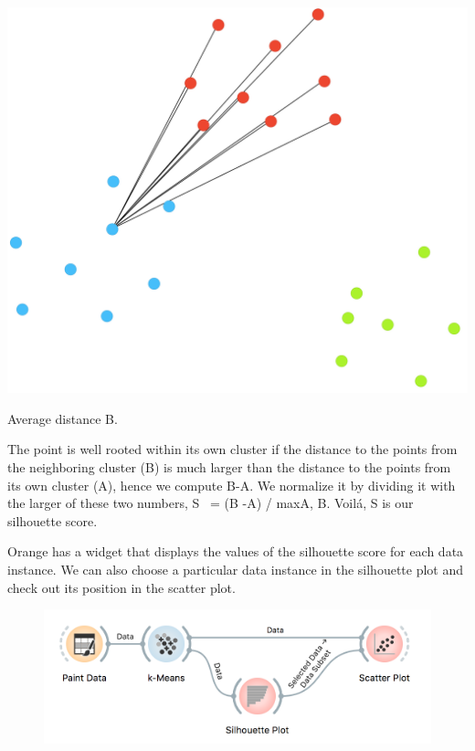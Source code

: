 \begin{marginfigure}
    \centering
    \includegraphics[scale=0.25]{silhouette-pt2.png}
    \caption{Average distance B.}
\end{marginfigure}

The point is well rooted within its own cluster if the distance to the points from the neighboring cluster (B) is much larger than the distance to the points from its own cluster (A), hence we compute B-A. We normalize it by dividing it with the larger of these two numbers, S  = (B -A) / max{A, B}. Voilá, S is our silhouette score.

Orange has a  widget that displays the values of the silhouette score for each data instance. We can also choose a particular data instance in the silhouette plot and check out its position in the scatter plot.


\begin{figure}[h]
    \centering
    \includegraphics[width=\linewidth]{silhouette-workflow.png}
    \caption{$\;$} %
\end{figure}

